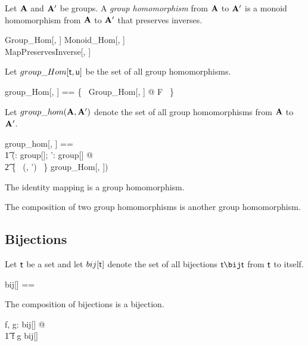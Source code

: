 \documentclass{amsart}
\begin{document}
Let $\mathbf{A}$ and $\mathbf{A}'$ be groups.
A \textit{group homomorphism} from $\mathbf{A}$ to $\mathbf{A}'$ is a monoid homomorphism
from $\mathbf{A}$ to $\mathbf{A}'$ that preserves inverses.

\begin{schema}{Group\_Hom}[\genT, \genU]
	Monoid\_Hom[\genT, \genU] \\
	MapPreservesInverse[\genT, \genU]
\end{schema}

Let $group\_Hom[\mathsf{t}, \mathsf{u}]$ be the set of all group homomorphisms.

\begin{zed}
	group\_Hom[\genT, \genU] == \{~ Group\_Hom[\genT, \genU] @ F ~\}
\end{zed}

Let $group\_hom(\mathbf{A}, \mathbf{A}')$ denote the set of all group homomorphisms from $\mathbf{A}$ to $\mathbf{A}'$.

\begin{zed}
	group\_hom[\genT, \genU] == \\
	\t1	(\lambda \strucA: group[\genT]; \strucA': group[\genU] @ \\
	\t2		\{~ (\strucA, \strucA') ~\} \dres group\_Hom[\genT, \genU])
\end{zed}

\begin{remark}
The identity mapping is a group homomorphism.
\end{remark}

\begin{remark}
The composition of two group homomorphisms is another group homomorphism.
\end{remark}

\subsection{Bijections}

Let $\mathsf{t}$ be a set and let $bij[\mathsf{t}]$ denote the set of all bijections $\genT \bij \genT$ from $\mathsf{t}$ to itself.
\begin{zed}
	bij[\genT] == \genT \bij \genT
\end{zed}

\begin{remark}
The composition of bijections is a bijection.

\begin{zed}
	\forall f, g: bij[\setT] @ \\
	\t1	f \circ g \in bij[\setT]
\end{zed}

\end{remark}
\end{document}
